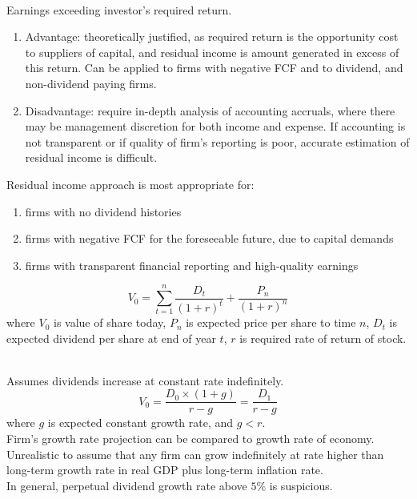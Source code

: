\begin{definition} \\
Earnings exceeding investor's required return.
\begin{enumerate}[label=\roman*.]
\setlength{\itemsep}{0pt}
\item Advantage: theoretically justified, as required return is the opportunity cost to suppliers of capital, and residual income is amount generated in excess of this return. Can be applied to firms with negative FCF and to dividend, and non-dividend paying firms.
\item Disadvantage: require in-depth analysis of accounting accruals, where there may be management discretion for both income and expense. If accounting is not transparent or if quality of firm's reporting is poor, accurate estimation of residual income is difficult.
\end{enumerate}
Residual income approach is most appropriate for:
\begin{enumerate}[label=\roman*.]
\setlength{\itemsep}{0pt}
\item firms with no dividend histories
\item firms with negative FCF for the foreseeable future, due to capital demands
\item firms with transparent financial reporting and high-quality earnings
\end{enumerate}
\end{definition}

\begin{definition} 
\begin{equation}
V_0 = \sum\limits_{t=1}^n \frac{D_t}{(1+r)^t} + \frac{P_n}{(1+r)^n} \nonumber
\end{equation}
where $V_0$ is value of share today, $P_n$ is expected price per share to time $n$, $D_t$ is expected dividend per share at end of year $t$, $r$ is required rate of return of stock. 
\end{definition}

\begin{definition} \\
Assumes dividends increase at constant rate indefinitely. 
\begin{equation}
V_0 = \frac{D_0 \times (1+g)}{r-g} = \frac{D_1}{r-g} \nonumber
\end{equation}
where $g$ is expected constant growth rate, and $g < r$.\\
Firm's growth rate projection can be compared to growth rate of economy. Unrealistic to assume that any firm can grow indefinitely at rate higher than long-term growth rate in real GDP plus long-term inflation rate.\\
In general, perpetual dividend growth rate above $5\%$ is suspicious.\\
\end{definition}

